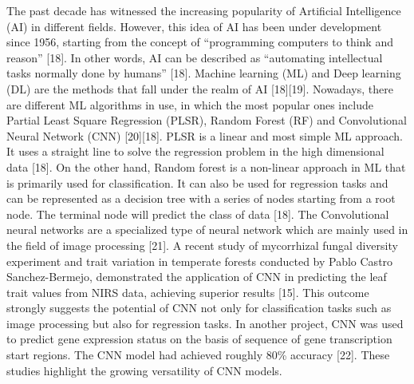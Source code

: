 \documentclass[12pt,a4paper]{report}
\begin{document}
The past decade has witnessed the increasing popularity of  Artificial Intelligence (AI) in different fields. However, this idea of AI has been under development since 1956, starting from the concept of “programming computers to think and reason” [18]. In other words, AI can be described as “automating intellectual tasks normally done by humans” [18]. Machine learning (ML) and Deep learning (DL) are the methods that fall under the realm of AI [18][19]. 
Nowadays, there are different ML algorithms in use, in which the most popular ones include Partial Least Square Regression (PLSR), Random Forest (RF) and Convolutional Neural Network (CNN) [20][18]. PLSR is a linear and most simple ML approach. It uses a straight line to solve the regression problem in the high dimensional data [18]. On the other hand,  Random forest is a non-linear approach in ML that is primarily used for classification. It can also 
be used for regression tasks and can be represented as a decision tree with a series of nodes starting from a root node. The terminal node will predict the class of data [18]. The Convolutional neural networks are a specialized type of neural network which are mainly used in the field of image processing [21]. A recent study of mycorrhizal fungal diversity experiment and  trait variation in temperate forests  conducted by Pablo Castro Sanchez-Bermejo, 
demonstrated the application of CNN in predicting the leaf trait values from NIRS data, achieving superior results [15]. This outcome strongly suggests the potential of CNN not only for classification tasks such as image processing but also for regression tasks. In another project, CNN was used to predict gene expression status on the basis of sequence of gene transcription start regions. The CNN model had achieved roughly 80\% accuracy [22]. 
These studies highlight the growing versatility of CNN models. \\
\end{document}
